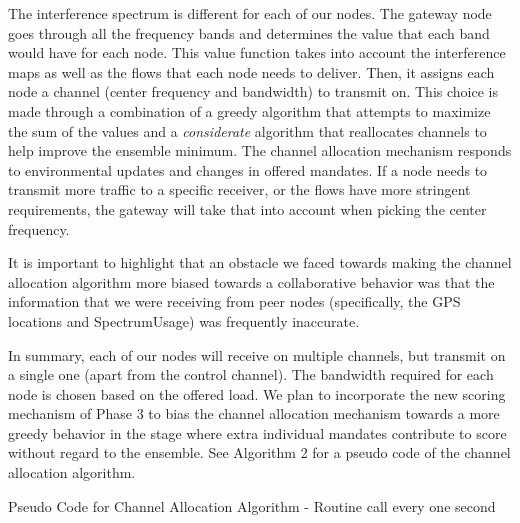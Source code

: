 \documentclass[11pt]{article}
\begin{document}
The interference spectrum is different
for each of our nodes. The gateway node goes through all the
frequency bands and determines the value that each band would have for each node. This value function takes into account the interference maps as well as the flows that each node needs to deliver. Then, it assigns each node a channel (center frequency and bandwidth) to transmit on. This choice is made through a combination of a greedy algorithm that attempts to maximize the sum of the values and a \emph{considerate} algorithm that reallocates channels to help improve the ensemble minimum. The channel allocation mechanism responds to environmental updates and changes in offered mandates. If  a  node  needs  to  transmit  more  traffic  to  a  specific  receiver,  or  the  flows  have  more  stringent requirements, the gateway will take that into account when picking the center frequency.

It is important to highlight that an obstacle we faced towards making the channel allocation algorithm more biased towards a collaborative behavior was that the information that we were receiving from peer nodes (specifically, the GPS locations and SpectrumUsage) was frequently inaccurate.
 
In summary, each of our nodes will receive on multiple channels, but transmit on a single one (apart from the control channel). The bandwidth required for each node is chosen based on the offered load. We plan to incorporate the new scoring mechanism of Phase 3 to bias the channel allocation mechanism towards a more greedy behavior in the stage where extra individual mandates contribute to score without regard to the ensemble. See Algorithm 2 for a pseudo code of the channel allocation algorithm.

\begin{algorithm}
\begin{algorithmic}[1]
\caption{Pseudo Code for Channel Allocation Algorithm - Routine call every one second}
\EndIf
\end{algorithmic}
\label{alg:chanalloc}
\end{algorithm}
\end{document}
